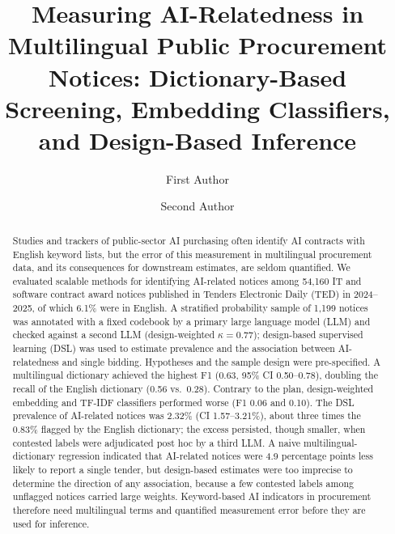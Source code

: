\documentclass[runningheads]{llncs}
\begin{document}
\title{Measuring AI-Relatedness in Multilingual Public Procurement Notices: Dictionary-Based Screening, Embedding Classifiers, and Design-Based Inference}
\author{First Author \and Second Author}
\maketitle

\begin{abstract}
Studies and trackers of public-sector AI purchasing often identify AI contracts with English keyword lists, but the error of this measurement in multilingual procurement data, and its consequences for downstream estimates, are seldom quantified. We evaluated scalable methods for identifying AI-related notices among 54,160 IT and software contract award notices published in Tenders Electronic Daily (TED) in 2024--2025, of which 6.1\% were in English. A stratified probability sample of 1,199 notices was annotated with a fixed codebook by a primary large language model (LLM) and checked against a second LLM (design-weighted $\kappa=0.77$); design-based supervised learning (DSL) was used to estimate prevalence and the association between AI-relatedness and single bidding. Hypotheses and the sample design were pre-specified. A multilingual dictionary achieved the highest F1 (0.63, 95\% CI 0.50--0.78), doubling the recall of the English dictionary (0.56 vs.\ 0.28). Contrary to the plan, design-weighted embedding and TF-IDF classifiers performed worse (F1 0.06 and 0.10). The DSL prevalence of AI-related notices was 2.32\% (CI 1.57--3.21\%), about three times the 0.83\% flagged by the English dictionary; the excess persisted, though smaller, when contested labels were adjudicated post hoc by a third LLM. A naive multilingual-dictionary regression indicated that AI-related notices were 4.9 percentage points less likely to report a single tender, but design-based estimates were too imprecise to determine the direction of any association, because a few contested labels among unflagged notices carried large weights. Keyword-based AI indicators in procurement therefore need multilingual terms and quantified measurement error before they are used for inference.
\end{abstract}
\end{document}

